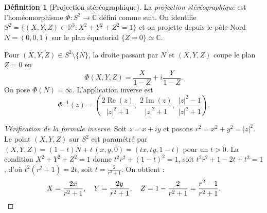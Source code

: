 \documentclass[12pt,a4paper,openany]{book}
\theoremstyle{definition}
\newtheorem{definition}{Définition}[chapter]
\theoremstyle{plain}
\theoremstyle{remark}
\newcommand{\C}{\mathbb{C}}
\newcommand{\R}{\mathbb{R}}
\DeclareMathOperator{\re}{Re}
\DeclareMathOperator{\im}{Im}
\newcommand{\abs}[1]{\left|#1\right|}
\begin{document}
\begin{definition}[Projection stéréographique]\label{def:projection-stereo}
La \emph{projection stéréographique} est l'homéomorphisme $\Phi : S^2 \to \hat{\C}$ défini comme suit. On identifie $S^2 = \{(X,Y,Z) \in \R^3 : X^2 + Y^2 + Z^2 = 1\}$ et on projette depuis le pôle Nord $N = (0,0,1)$ sur le plan équatorial $\{Z = 0\} \simeq \C$.

Pour $(X,Y,Z) \in S^2 \setminus \{N\}$, la droite passant par $N$ et $(X,Y,Z)$ coupe le plan $Z=0$ en
\[
  \Phi(X,Y,Z) = \frac{X}{1-Z} + i\frac{Y}{1-Z}.
\]
On pose $\Phi(N) = \infty$. L'application inverse est
\[
  \Phi^{-1}(z) = \left(\frac{2\re(z)}{\abs{z}^2+1},\; \frac{2\im(z)}{\abs{z}^2+1},\; \frac{\abs{z}^2-1}{\abs{z}^2+1}\right).
\]
\end{definition}

\begin{proof}[Vérification de la formule inverse]
Soit $z = x + iy$ et posons $r^2 = x^2 + y^2 = \abs{z}^2$. Le point $(X,Y,Z)$ sur $S^2$ est paramétré par $(X,Y,Z) = (1-t)N + t\,(x,y,0) = (tx, ty, 1-t)$ pour un $t > 0$. La condition $X^2+Y^2+Z^2 = 1$ donne $t^2r^2 + (1-t)^2 = 1$, soit $t^2 r^2 + 1 - 2t + t^2 = 1$, d'où $t^2(r^2+1) = 2t$, soit $t = \frac{2}{r^2+1}$. On obtient :
\[
  X = \frac{2x}{r^2+1},\quad Y = \frac{2y}{r^2+1},\quad Z = 1 - \frac{2}{r^2+1} = \frac{r^2-1}{r^2+1}. \qedhere
\]
\end{proof}

\begin{center}
\end{center}
\end{document}
